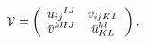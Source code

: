 \begin{equation}
{\cal V} = \left(
\begin{array}{cc}
{u_{ij}}^{IJ} & v_{ijKL} \\ \bar{v}^{klIJ} & {\bar{u}^{kl}}_{KL}
    \label{vielbein}
\end{array}
\right).
\end{equation}


